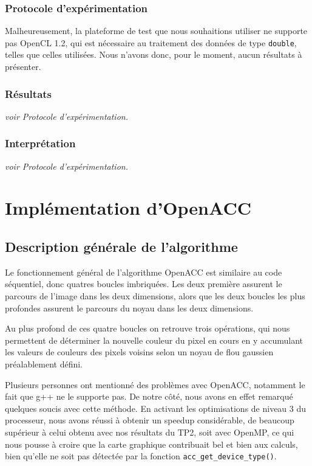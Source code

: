 \documentclass[11pt]{report}
\begin{document}
	
		\subsection{Protocole d'expérimentation}
				Malheureusement, la plateforme de test que nous souhaitions utiliser ne supporte pas OpenCL 1.2, qui est nécessaire au traitement des données de type \texttt{double}, telles que celles utilisées. Nous n'avons donc, pour le moment, aucun résultats à présenter.
				
		\subsection{Résultats}
			\textit{voir Protocole d'expérimentation.}
		\subsection{Interprétation}
			\textit{voir Protocole d'expérimentation.}
	
\clearpage
\chapter{Implémentation d'OpenACC}
	
	\section{Description générale de l'algorithme}
		Le fonctionnement général de l'algorithme OpenACC est similaire au code séquentiel, donc quatres boucles imbriquées. Les deux première assurent le parcours de l'image dans les deux dimensions, alors que les deux boucles les plus profondes assurent le parcours du noyau dans les deux dimensions. 
		
		\bigskip
		Au plus profond de ces quatre boucles on retrouve trois opérations, qui nous permettent de déterminer la nouvelle couleur du pixel en cours en y accumulant les valeurs de couleurs des pixels voisins selon un noyau de flou gaussien préalablement défini.
		
		\bigskip
		Plusieurs personnes ont mentionné des problèmes avec OpenACC, notamment le fait que g++ ne le supporte pas. De notre côté, nous avons en effet remarqué quelques soucis avec cette méthode. En activant les optimisations de niveau 3 du processeur, nous avons réussi à obtenir un speedup considérable, de beaucoup supérieur à celui obtenu avec nos résultats du TP2, soit avec OpenMP, ce qui nous pousse à croire que la carte graphique contribuait bel et bien aux calculs, bien qu'elle ne soit pas détectée par la fonction \texttt{acc\_get\_device\_type()}.
		
\end{document}
